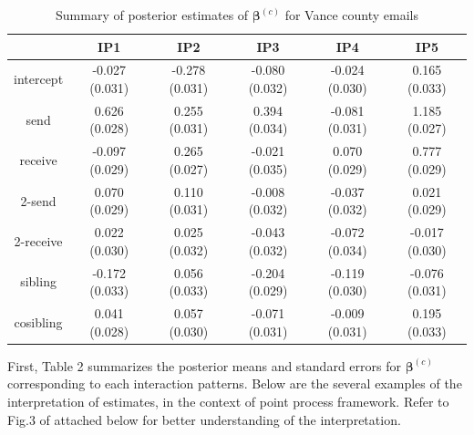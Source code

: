 \documentclass[a4paper]{article}
\begin{document}
\begin{table}[ht]
	\centering
	\begin{tabular}{|c|c|c|c|c|c|} 
		\hline
		& \textbf{IP1} & \textbf{IP2} &\textbf{IP3}&\textbf{IP4}&\textbf{IP5}\\
		\hline
		intercept &-0.027 (0.031)& -0.278 (0.031)&-0.080 (0.032)& -0.024 (0.030)&0.165 (0.033)\\
		send&  0.626 (0.028)&  0.255 (0.031)&  0.394 (0.034)&-0.081 (0.031) &1.185 (0.027)\\
		receive& -0.097 (0.029)& 0.265 (0.027)&-0.021 (0.035)& 0.070 (0.029)& 0.777 (0.029)\\
		2-send&0.070 (0.029)&0.110 (0.031)&-0.008 (0.032)&-0.037 (0.032)& 0.021 (0.029)\\
		2-receive& 0.022 (0.030)& 0.025 (0.032)&-0.043 (0.032)&-0.072 (0.034)&-0.017 (0.030)\\
		sibling&-0.172 (0.033)&  0.056 (0.033)&-0.204 (0.029)&-0.119 (0.030)&-0.076 (0.031)\\
		cosibling& 0.041 (0.028)&  0.057 (0.030)& -0.071 (0.031)&-0.009 (0.031)&  0.195 (0.033)\\
		\hline
	\end{tabular}
	\caption {Summary of posterior estimates of $\boldsymbol{\beta}^{(c)}$ for Vance county emails}
	\label{table:Vancebeta}
\end{table}
\newline
\normalsize First, Table 2 summarizes the posterior means and standard errors for $\boldsymbol{\beta}^{(c)}$ corresponding to each interaction patterns. Below are the several examples of the interpretation of estimates, in the context of point process framework. Refer to Fig.3 of \cite{PerryWolfe2012} attached below for better understanding of the interpretation.
\end{document}
